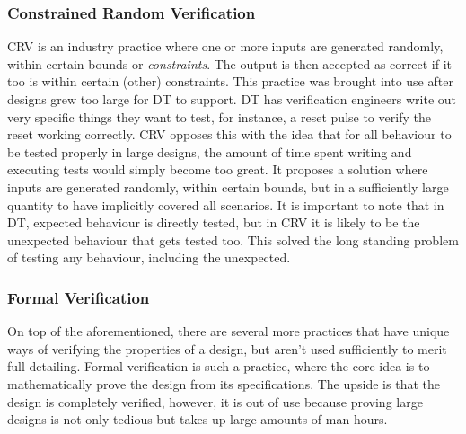 \documentclass[11pt,british]{article}
\begin{document}
\subsubsection{Constrained Random Verification}
\gls{CRV} is an industry practice where one or more inputs are generated randomly, within certain bounds or \emph{constraints}.\cite{crv1,crv2} The output is then accepted as correct if it too is within certain (other) constraints. This practice was brought into use after designs grew too large for \gls{DT} to support. DT has verification engineers write out very specific things they want to test, for instance, a reset pulse to verify the reset working correctly. CRV opposes this with the idea that for all behaviour to be tested properly in large designs, the amount of time spent writing and executing tests would simply become too great. It proposes a solution where inputs are generated randomly, within certain bounds, but in a sufficiently large quantity to have implicitly covered all scenarios. It is important to note that in DT, expected behaviour is directly tested, but in CRV it is likely to be the unexpected behaviour that gets tested too. This solved the long standing problem of testing any behaviour, including the unexpected.

\subsubsection{Formal Verification}
On top of the aforementioned, there are several more practices that have unique ways of verifying the properties of a design, but aren't used sufficiently to merit full detailing. Formal verification is such a practice, where the core idea is to mathematically prove the design from its specifications.\cite{assertformal,formal} The upside is that the design is completely verified, however, it is out of use because proving large designs is not only tedious but takes up large amounts of man-hours.

\end{document}
